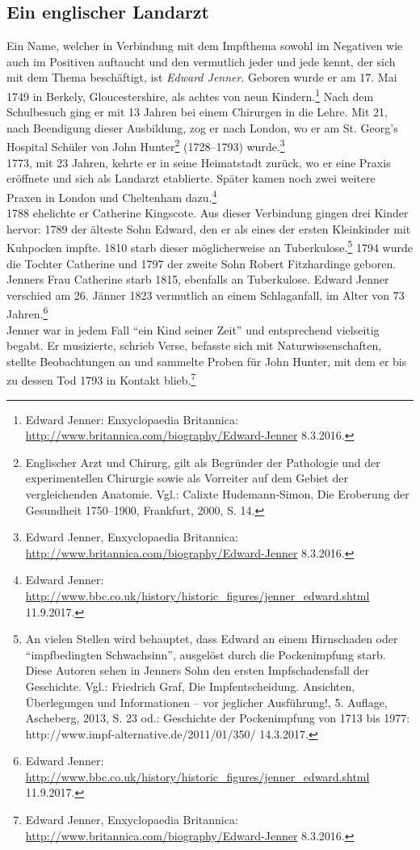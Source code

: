 \documentclass[
    a4paper,
    12pt,
    hyphens,
    chapterprefix=true,
    headheight=33pt,
    footheight=29pt,
    headings=optiontohead, %
]{scrartcl}
\begin{document}
\subsection{Ein englischer Landarzt}
Ein Name, welcher in Verbindung mit dem Impfthema sowohl im Negativen wie auch im Positiven auftaucht und den vermutlich jeder und jede kennt, der sich mit dem Thema beschäftigt, ist \textit{Edward Jenner}.  
Geboren wurde er am 17. Mai 1749 in Berkely, Gloucestershire, als achtes von neun Kindern.\footnote{Edward Jenner:  Enxyclopaedia Britannica: \url{http://www.britannica.com/biography/Edward-Jenner} 8.3.2016.} Nach dem Schulbesuch ging er mit 13 Jahren bei einem Chirurgen in die Lehre. Mit 21, nach Beendigung dieser Ausbildung, zog er nach London, wo er am St. Georg's Hospital Schüler von John Hunter\footnote{Englischer Arzt und Chirurg, gilt als Begründer der Pathologie und der experimentellen Chirurgie sowie als Vorreiter auf dem Gebiet der vergleichenden Anatomie. Vgl.: Calixte Hudemann-Simon, Die Eroberung der Gesundheit 1750--1900, Frankfurt, 2000, S. 14.} (1728--1793) wurde.\footnote{Edward Jenner, Enxyclopaedia Britannica: \url{http://www.britannica.com/biography/Edward-Jenner} 8.3.2016.}\\
1773, mit 23 Jahren, kehrte er in seine Heimatstadt zurück, wo er eine Praxis eröffnete und sich als Landarzt etablierte. Später kamen noch zwei weitere Praxen in London und Cheltenham dazu.\footnote{Edward Jenner: \url{http://www.bbc.co.uk/history/historic_figures/jenner_edward.shtml} 11.9.2017.}\\
1788 ehelichte er Catherine Kingscote. Aus dieser Verbindung gingen drei Kinder hervor: 1789 der älteste Sohn Edward, den er als eines der ersten Kleinkinder mit Kuhpocken impfte. 1810 starb dieser möglicherweise an Tuberkulose.\footnote{An vielen Stellen wird behauptet, dass Edward an einem Hirnschaden oder "`impfbedingten Schwachsinn"', ausgelöst durch die Pockenimpfung starb. Diese Autoren sehen in Jenners Sohn den ersten Impfschadensfall der Geschichte. Vgl.: Friedrich Graf, Die Impfentscheidung. Ansichten, Überlegungen und Informationen -- vor jeglicher Ausführung!, 5. Auflage, Ascheberg, 2013, S. 23 od.: Geschichte der Pockenimpfung von 1713 bis 1977: http://www.impf-alternative.de/2011/01/350/ 14.3.2017.} 1794 wurde die Tochter Catherine und 1797 der zweite Sohn Robert Fitzhardinge geboren. Jenners Frau Catherine starb 1815, ebenfalls an Tuberkulose. Edward Jenner verschied am 26. Jänner 1823 vermutlich an einem Schlaganfall, im Alter von 73 Jahren.\footnote{Edward Jenner: \url{http://www.bbc.co.uk/history/historic\_figures/jenner\_edward.shtml} 11.9.2017.}\\
Jenner war in jedem Fall "`ein Kind seiner Zeit"' und entsprechend vielseitig begabt. Er musizierte, schrieb Verse, befasste sich mit Naturwissenschaften, stellte Beobachtungen an und sammelte Proben für John Hunter, mit dem er bis zu dessen Tod 1793 in Kontakt blieb.\footnote{Edward Jenner, Enxyclopaedia Britannica: \url{http://www.britannica.com/biography/Edward-Jenner} 8.3.2016.}\\
\end{document}
